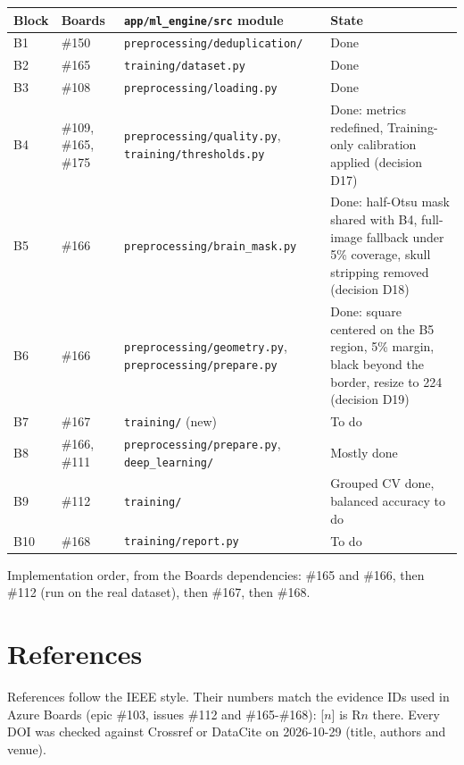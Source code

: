 \documentclass[11pt,a4paper]{article}
\newcommand{\board}[1]{\textsf{\##1}}
\begin{document}
\begin{center}
\begin{tabularx}{\textwidth}{@{}l l L L@{}}
\toprule
Block & Boards & \texttt{app/ml\_engine/src} module & State \\
\midrule
B1  & \board{150} & \texttt{preprocessing/deduplication/} & Done \\
B2  & \board{165} & \texttt{training/dataset.py} & Done \\
B3  & \board{108} & \texttt{preprocessing/loading.py} & Done \\
B4  & \board{109}, \board{165}, \board{175} & \texttt{preprocessing/quality.py}, \texttt{training/thresholds.py} & Done: metrics redefined, Training-only calibration applied (decision D17) \\
B5  & \board{166} & \texttt{preprocessing/brain\_mask.py} & Done: half-Otsu mask shared with B4, full-image fallback under 5\% coverage, skull stripping removed (decision D18) \\
B6  & \board{166} & \texttt{preprocessing/geometry.py}, \texttt{preprocessing/prepare.py} & Done: square centered on the B5 region, 5\% margin, black beyond the border, resize to 224 (decision D19) \\
B7  & \board{167} & \texttt{training/} (new) & To do \\
B8  & \board{166}, \board{111} & \texttt{preprocessing/prepare.py}, \texttt{deep\_learning/} & Mostly done \\
B9  & \board{112} & \texttt{training/} & Grouped CV done, balanced accuracy to do \\
B10 & \board{168} & \texttt{training/report.py} & To do \\
\bottomrule
\end{tabularx}
\end{center}

Implementation order, from the Boards dependencies: \board{165} and \board{166}, then \board{112} (run on the real dataset), then \board{167}, then \board{168}.

\section{References}\label{sec:refs}

References follow the IEEE style. Their numbers match the evidence IDs used in Azure Boards (epic \#103, issues \#112 and \#165-\#168): [$n$] is R$n$ there. Every DOI was checked against Crossref or DataCite on 2026-10-29 (title, authors and venue).
\end{document}

